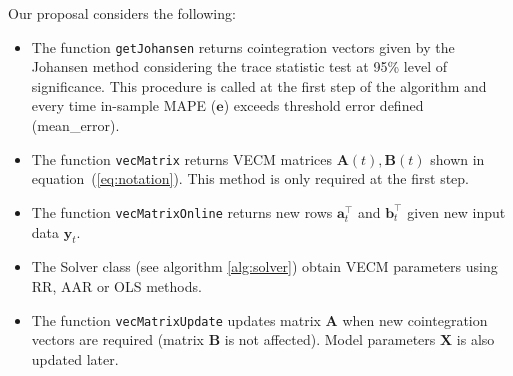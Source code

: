 \documentclass[twocolumn]{svjour3}          %
\begin{document}
Our proposal considers the following:

\begin{itemize}
\item The function \texttt{getJohansen} returns cointegration vectors given by the
Johansen method considering the trace statistic test at 95\% level of
significance. This procedure is called at the first step of the algorithm and
every time in-sample MAPE ($\mathbf{e}$) exceeds threshold error defined (mean\_error).
\item The function \texttt{vecMatrix} returns VECM
matrices $\mathbf{A}(t),\mathbf{B}(t)$ shown in equation~(\ref{eq:notation}). This
method is only required at the first step.
\item The function \texttt{vecMatrixOnline} returns new rows $\mathbf{a}_t^\top$ and
$\mathbf{b}_t^\top$ given new input data $\mathbf{y}_t$.
\item The Solver class (see algorithm \ref{alg:solver}) obtain VECM parameters  
using RR, AAR or OLS methods.
\item The function \texttt{vecMatrixUpdate} updates matrix $\mathbf{A}$ when new
cointegration vectors are required (matrix $\mathbf{B}$ is not affected). Model
parameters $\mathbf{X}$ is also updated later.
\end{itemize}
\end{document}
